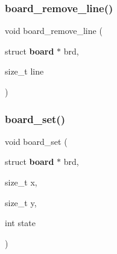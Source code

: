 \mbox{\label{board_8c_a3226412915027b501268d21990806292}} 
\subsubsection{board\+\_\+remove\+\_\+line()}
{\footnotesize\ttfamily void board\+\_\+remove\+\_\+line (\begin{DoxyParamCaption}\item[{struct \textbf{ board} $\ast$}]{brd,  }\item[{size\+\_\+t}]{line }\end{DoxyParamCaption})\hspace{0.3cm}{\ttfamily [inline]}}

\mbox{\label{board_8c_a0a13fafac262382a3d46168a8f3bea62}} 
\subsubsection{board\+\_\+set()}
{\footnotesize\ttfamily void board\+\_\+set (\begin{DoxyParamCaption}\item[{struct \textbf{ board} $\ast$}]{brd,  }\item[{size\+\_\+t}]{x,  }\item[{size\+\_\+t}]{y,  }\item[{int}]{state }\end{DoxyParamCaption})\hspace{0.3cm}{\ttfamily [inline]}}

